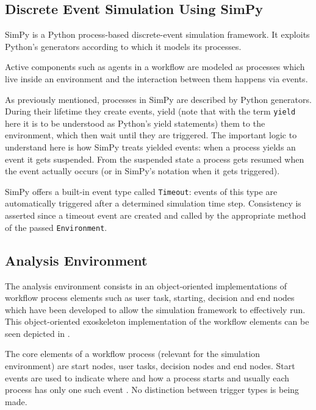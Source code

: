 \documentclass{seal_thesis}
\begin{document}
\subsection{Discrete Event Simulation Using SimPy}
\label{subsec:discrete_event_sim}

SimPy is a Python process-based discrete-event simulation framework. It exploits Python's generators according to which it models its processes.

Active components such as agents in a workflow are modeled as processes which live inside an environment and the interaction between them happens via events.

As previously mentioned, processes in SimPy are described by Python generators. During their lifetime they create events, yield (note that with the term \texttt{yield} here it is to be understood as Python's yield statements) them to the environment, which then wait until they are triggered. The important logic to understand here is how SimPy treats yielded events: when a process yields an event it gets suspended. From the suspended state a process gets resumed when the event actually occurs (or in SimPy's notation when it gets triggered).

SimPy offers a built-in event type called \texttt{Timeout}: events of this type are automatically triggered after a determined simulation time step. Consistency is asserted since a timeout event are created and called by the appropriate method of the passed \texttt{Environment}.

\subsection{Analysis Environment}

The analysis environment consists in an object-oriented implementations of workflow process elements such as user task, starting, decision and end nodes which have been developed to allow the simulation framework to effectively run. This object-oriented exoskeleton implementation of the workflow elements can be seen depicted in .


The core elements of a workflow process (relevant for the simulation environment) are start nodes, user tasks, decision nodes and end nodes. Start events are used to indicate where and how a process starts and usually each process has only one such event \cite[p. 42]{Silver2011}. No distinction between trigger types is being made.
\end{document}
